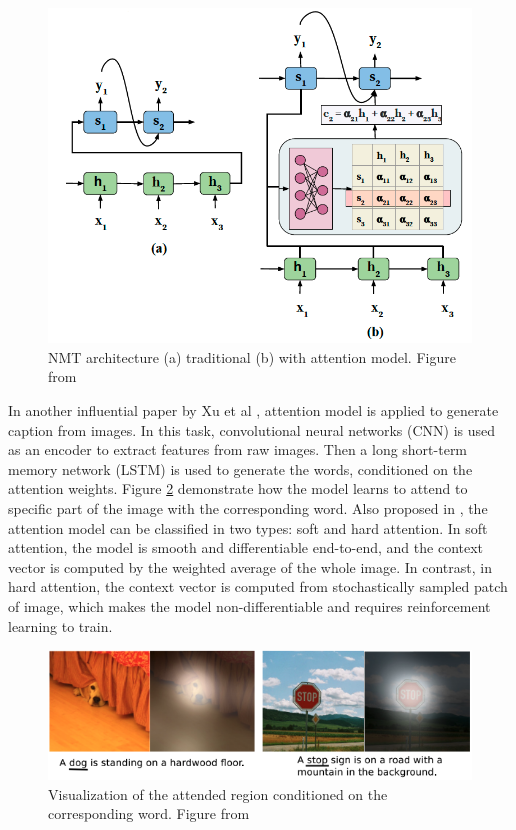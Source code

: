 \documentclass[journal]{IEEEtran}
\begin{document}
\begin{figure}[htb]
  \centering
  \includegraphics[width=0.7\columnwidth]{NMT.png}
  \caption{NMT architecture (a) traditional (b) with attention model.
  Figure from \cite{chaudhari1904attentive}}
  \label{NMT}
\end{figure}

In another influential paper by Xu et al \cite{xu2015show}, attention model is applied to generate caption from images. 
In this task, convolutional neural networks (CNN) is used as an encoder to extract features from raw images.
Then a long short-term memory network (LSTM) is used to generate the words, conditioned on the attention weights.
Figure \ref{attention} demonstrate how the model learns to attend to specific part of the image with the corresponding word. 
Also proposed in \cite{xu2015show}, the attention model can be classified in two types: soft and hard attention. 
In soft attention, the model is smooth and differentiable end-to-end, and the context vector is computed by the weighted average of the whole image. 
In contrast, in hard attention, the context vector is computed from stochastically sampled patch of image, 
which makes the model non-differentiable and requires reinforcement learning to train.

\begin{figure}[htb]
  \includegraphics[width=\linewidth]{attention.png}
  \caption{Visualization of the attended region conditioned on the corresponding word.
  Figure from \cite{xu2015show}}
  \label{attention}
\end{figure}
\end{document}
